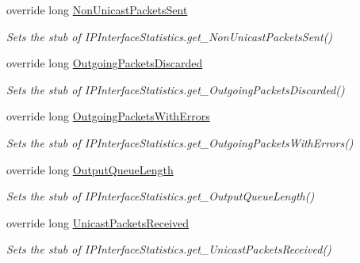 \begin{DoxyCompactItemize}
override long \hyperlink{class_system_1_1_net_1_1_network_information_1_1_fakes_1_1_stub_i_p_interface_statistics_a1b30701540d4f97557d239a28f1d1c24}{Non\-Unicast\-Packets\-Sent}
\begin{DoxyCompactList}\small\item\em Sets the stub of I\-P\-Interface\-Statistics.\-get\-\_\-\-Non\-Unicast\-Packets\-Sent()\end{DoxyCompactList}\item 
override long \hyperlink{class_system_1_1_net_1_1_network_information_1_1_fakes_1_1_stub_i_p_interface_statistics_ac4cb4dbb4687c8f5cfac120f202fcfb7}{Outgoing\-Packets\-Discarded}
\begin{DoxyCompactList}\small\item\em Sets the stub of I\-P\-Interface\-Statistics.\-get\-\_\-\-Outgoing\-Packets\-Discarded()\end{DoxyCompactList}\item 
override long \hyperlink{class_system_1_1_net_1_1_network_information_1_1_fakes_1_1_stub_i_p_interface_statistics_aa97c027bea345835cd577091ce9b751a}{Outgoing\-Packets\-With\-Errors}
\begin{DoxyCompactList}\small\item\em Sets the stub of I\-P\-Interface\-Statistics.\-get\-\_\-\-Outgoing\-Packets\-With\-Errors()\end{DoxyCompactList}\item 
override long \hyperlink{class_system_1_1_net_1_1_network_information_1_1_fakes_1_1_stub_i_p_interface_statistics_a0f39bf799c70f0de1e24cca2ae2d162e}{Output\-Queue\-Length}
\begin{DoxyCompactList}\small\item\em Sets the stub of I\-P\-Interface\-Statistics.\-get\-\_\-\-Output\-Queue\-Length()\end{DoxyCompactList}\item 
override long \hyperlink{class_system_1_1_net_1_1_network_information_1_1_fakes_1_1_stub_i_p_interface_statistics_aeb146b3c02b373bf3c8b6d7aa9fc2b97}{Unicast\-Packets\-Received}
\begin{DoxyCompactList}\small\item\em Sets the stub of I\-P\-Interface\-Statistics.\-get\-\_\-\-Unicast\-Packets\-Received()\end{DoxyCompactList}\item 

\end{DoxyCompactItemize}
